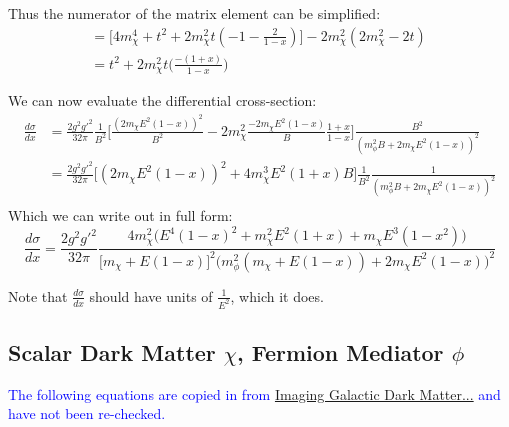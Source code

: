 \documentclass[11pt, oneside]{article}   	%
\begin{document}
Thus the numerator of the matrix element can be simplified:
\begin{align*}
&= \Big[ 4m_\chi^4 + t^2 + 2m_\chi^2 t(-1 - \frac{2}{1-x}) \Big] - 2m_\chi^2(2m_\chi^2 - 2t) \quad \\
&= t^2 + 2m_\chi^2t\Big(\frac{-(1+x)}{1-x}\Big)
\end{align*}

We can now evaluate the differential cross-section: 
\begin{align*}
\frac{d\sigma}{dx} %
&= \frac{2g^2g'^2}{32\pi} \frac{1}{B^2} \Big[ \frac{(2m_\chi E^2(1-x))^2}{B^2} - 2m_\chi^2 \frac{-2m_\chi E^2 (1-x)}{B} \frac{1+x}{1-x} \Big] \frac{B^2}{(m_\phi^2B + 2m_\chi E^2(1-x))^2}\\
&= \frac{2g^2g'^2}{32\pi} \Big[ (2m_\chi E^2(1-x))^2 + 4m_\chi^3 E^2(1+x)B \Big] \frac{1}{B^2} \frac{1}{(m_\phi^2B + 2m_\chi E^2(1-x))^2} \\
\end{align*}
Which we can write out in full form:
\[ \frac{d\sigma}{dx} = \frac{2g^2g'^2}{32\pi}  \frac{ 4m_\chi^2 \Big( E^4(1-x)^2 + m_\chi^2E^2(1+x) + m_\chi E^3(1-x^2) \Big ) }{\Big[ m_\chi + E(1-x) \Big]^2 \Big( m_\phi^2 (m_\chi + E(1-x)) + 2m_\chi E^2 (1-x) \Big)^2} \]

Note that $\frac{d\sigma}{dx}$ should have units of $\frac{1}{E^2}$, which it does. 

\newpage
\subsection{\normalsize Scalar Dark Matter $\chi$, Fermion Mediator $\phi$ }

\textcolor{blue}{The following equations are copied in from \href{https://arxiv.org/pdf/1703.00451.pdf}{Imaging Galactic Dark Matter...} and have not been re-checked.}
\end{document}

